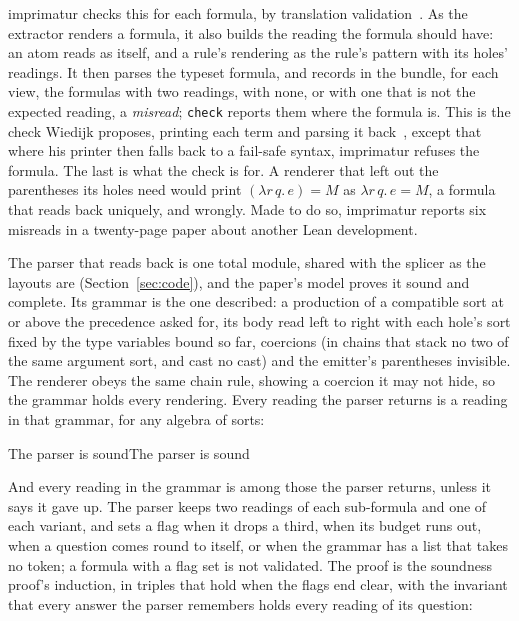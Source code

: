 \documentclass[acmsmall,screen,review,anonymous,nonacm]{acmart}
\begin{document}
imprimatur checks this for each formula, by translation
validation~\cite{Pnueli98}. As the
extractor renders a formula, it also builds the reading the formula should
have: an atom reads as itself, and a rule's rendering as the rule's pattern
with its holes' readings. It then parses the typeset formula, and records
in the bundle, for each view, the formulas with two readings, with none, or
with one that is not the expected reading, a \emph{misread}; \verb|check|
reports them where the formula is. This is the check Wiedijk proposes,
printing each term and parsing it back~\cite[\S8.1]{Wiedijk12}, except
that where his printer then falls back to a fail-safe syntax, imprimatur
refuses the formula. The last is what the check is for. A
renderer that left out the parentheses its holes need would print
$(\lambda r\, q.\, e) = M$ as $\lambda r\, q.\, e = M$, a formula that
reads back uniquely, and wrongly. Made to do so, imprimatur reports six
misreads in a twenty-page paper about another Lean development.

The parser that reads back is one total module, shared with the splicer
as the layouts are (Section~\ref{sec:code}), and the paper's model proves
it sound and complete. Its grammar is the one described: a production of
a compatible sort at or above the precedence asked for, its body read left
to right with each hole's sort fixed by the type variables bound so far,
coercions (in chains that stack no two of the same argument sort, and
cast no cast) and the emitter's parentheses invisible. The renderer obeys
the same chain rule, showing a coercion it may not hide, so the grammar
holds every rendering. Every reading the
parser returns is a reading in that grammar, for any algebra of sorts:

\begin{leantheorem}[sum=JkfwO6thsZ]{The parser is sound}{The parser is sound}
\label{thm:The-parser-is-sound}
\LeanProse{Let $\mathcal{S} \in \texttt{Sorts}$, $G \in \texttt{Grammar}$, $\mathit{ts} \in \mathsf{Array}(\mathit{String})$, $s \in \mathit{String}$ and $\mathit{rd} \in \texttt{Reading}$. Assume $\mathit{rd} \in \mathsf{readings}_{\mathcal{S}}(G, \mathit{ts}, s)$. Then there is $\sigma$ such that $\mathit{ts}[0, |\mathit{ts}|) \rightsquigarrow^{G}_{\mathcal{S}}(s, 0, \mathsf{none}, \mathsf{top}_{G})\ \mathit{rd} : \sigma$.}
\end{leantheorem}

And every reading in the grammar is among those the parser returns, unless
it says it gave up. The parser keeps two readings of each sub-formula and
one of each variant, and sets a flag when it drops a third, when its
budget runs out, when a question comes round to itself, or when the
grammar has a list that takes no token; a formula with a flag set is not
validated. The proof is the soundness proof's induction, in triples that
hold when the flags end clear, with the invariant that every answer the
parser remembers holds every reading of its question:
\end{document}

